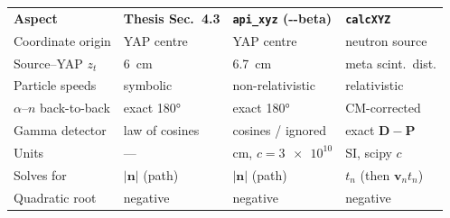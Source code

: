 \documentclass[11pt]{article}
\newcommand{\code}[1]{\texttt{\small #1}}
\begin{document}
\begin{center}
\begin{tabular}{p{3.0cm} p{2.9cm} p{2.9cm} p{3.0cm}}
\toprule
\rowcolor{steel}\color{white}\textbf{Aspect} & \color{white}\textbf{Thesis Sec.\ 4.3} & \color{white}\textbf{\code{api\_xyz} (-{}-beta)} & \color{white}\textbf{\code{calcXYZ}}\\
Coordinate origin & YAP centre & YAP centre & neutron source\\
\rowcolor{rowg}Source--YAP $z_t$ & \SI{6}{\cm} & \SI{6.7}{\cm} & meta scint.\ dist.\\
Particle speeds & symbolic & non-relativistic & relativistic\\
\rowcolor{rowg}$\alpha$--$n$ back-to-back & exact \ang{180} & exact \ang{180} & CM-corrected\\
Gamma detector & law of cosines & cosines / ignored & exact $\bm D-\bm P$\\
\rowcolor{rowg}Units & --- & cm, $c=\num{3e10}$ & SI, scipy $c$\\
Solves for & $|\bm n|$ (path) & $|\bm n|$ (path) & $t_n$ (then $\bm v_n t_n$)\\
\rowcolor{rowg}Quadratic root & negative & negative & negative\\
\bottomrule
\end{tabular}
\end{center}
\end{document}
